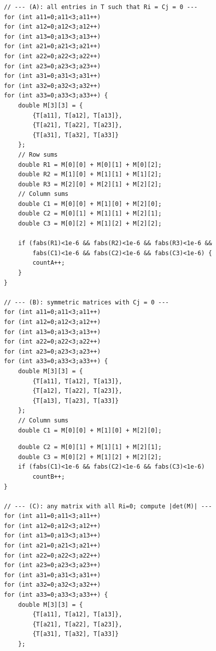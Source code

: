 \documentclass{beamer}
\theoremstyle{remark}
\numberwithin{equation}{section}
\numberwithin{equation}{section}
\begin{document}
\begin{frame}[fragile]
\begin{lstlisting}
    // --- (A): all entries in T such that Ri = Cj = 0 ---
    for (int a11=0;a11<3;a11++)
    for (int a12=0;a12<3;a12++)
    for (int a13=0;a13<3;a13++)
    for (int a21=0;a21<3;a21++)
    for (int a22=0;a22<3;a22++)
    for (int a23=0;a23<3;a23++)
    for (int a31=0;a31<3;a31++)
    for (int a32=0;a32<3;a32++)
    for (int a33=0;a33<3;a33++) {
        double M[3][3] = {
            {T[a11], T[a12], T[a13]},
            {T[a21], T[a22], T[a23]},
            {T[a31], T[a32], T[a33]}
        };
        // Row sums
        double R1 = M[0][0] + M[0][1] + M[0][2];
        double R2 = M[1][0] + M[1][1] + M[1][2];
        double R3 = M[2][0] + M[2][1] + M[2][2];
        // Column sums
        double C1 = M[0][0] + M[1][0] + M[2][0];
        double C2 = M[0][1] + M[1][1] + M[2][1];
        double C3 = M[0][2] + M[1][2] + M[2][2];

        if (fabs(R1)<1e-6 && fabs(R2)<1e-6 && fabs(R3)<1e-6 &&
            fabs(C1)<1e-6 && fabs(C2)<1e-6 && fabs(C3)<1e-6) {
            countA++;
        }
    }

    // --- (B): symmetric matrices with Cj = 0 ---
    for (int a11=0;a11<3;a11++)
    for (int a12=0;a12<3;a12++)
    for (int a13=0;a13<3;a13++)
    for (int a22=0;a22<3;a22++)
    for (int a23=0;a23<3;a23++)
    for (int a33=0;a33<3;a33++) {
        double M[3][3] = {
            {T[a11], T[a12], T[a13]},
            {T[a12], T[a22], T[a23]},
            {T[a13], T[a23], T[a33]}
        };
        // Column sums
        double C1 = M[0][0] + M[1][0] + M[2][0];
 \end{lstlisting}
\end{frame}
\begin{frame}[fragile]
\begin{lstlisting}
        double C2 = M[0][1] + M[1][1] + M[2][1];
        double C3 = M[0][2] + M[1][2] + M[2][2];
        if (fabs(C1)<1e-6 && fabs(C2)<1e-6 && fabs(C3)<1e-6)
            countB++;
    }

    // --- (C): any matrix with all Ri=0; compute |det(M)| ---
    for (int a11=0;a11<3;a11++)
    for (int a12=0;a12<3;a12++)
    for (int a13=0;a13<3;a13++)
    for (int a21=0;a21<3;a21++)
    for (int a22=0;a22<3;a22++)
    for (int a23=0;a23<3;a23++)
    for (int a31=0;a31<3;a31++)
    for (int a32=0;a32<3;a32++)
    for (int a33=0;a33<3;a33++) {
        double M[3][3] = {
            {T[a11], T[a12], T[a13]},
            {T[a21], T[a22], T[a23]},
            {T[a31], T[a32], T[a33]}
        };
   \end{lstlisting}
   \end{frame}
\end{document}
